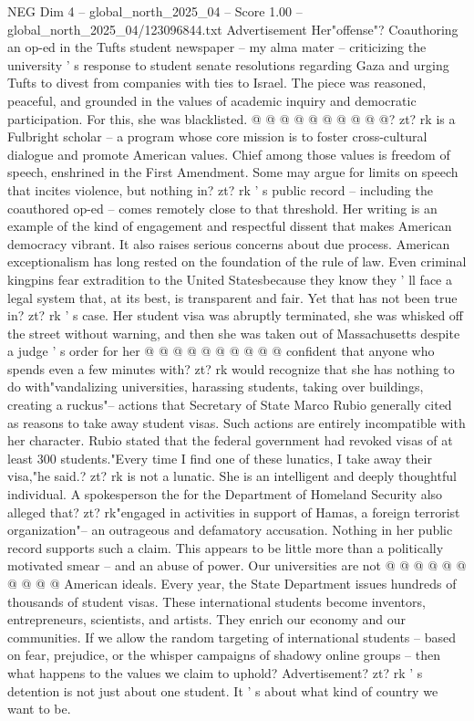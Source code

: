 \begin{textsample}{NEG Dim 4 – global\_north\_2025\_04 – Score 1.00 – global\_north\_2025\_04/123096844.txt}
Advertisement Her"offense"?
Coauthoring an op-ed in the Tufts student newspaper -- my alma mater -- criticizing the university ' s response to student senate resolutions regarding Gaza and urging Tufts to divest from companies with ties to Israel.
The piece was reasoned, peaceful, and grounded in the values of academic inquiry and democratic participation.
For this, she was blacklisted. @ @ @ @ @ @ @ @ @ @? zt? rk is a Fulbright scholar -- a program whose core mission is to foster cross-cultural dialogue and promote American values.
Chief among those values is freedom of speech, enshrined in the First Amendment.
Some may argue for limits on speech that incites violence, but nothing in? zt? rk ' s public record -- including the coauthored op-ed -- comes remotely close to that threshold.
Her writing is an example of the kind of engagement and respectful dissent that makes American democracy vibrant.
It also raises serious concerns about due process.
American exceptionalism has long rested on the foundation of the rule of law.
Even criminal kingpins fear extradition to the United Statesbecause they know they ' ll face a legal system that, at its best, is transparent and fair.
Yet that has not been true in? zt? rk ' s case.
Her student visa was abruptly terminated, she was whisked off the street without warning, and then she was taken out of Massachusetts despite a judge ' s order for her @ @ @ @ @ @ @ @ @ @ confident that anyone who spends even a few minutes with? zt? rk would recognize that she has nothing to do with"vandalizing universities, harassing students, taking over buildings, creating a ruckus"-- actions that Secretary of State Marco Rubio generally cited as reasons to take away student visas.
Such actions are entirely incompatible with her character.
Rubio stated that the federal government had revoked visas of at least 300 students."Every time I find one of these lunatics, I take away their visa,"he said.? zt? rk is not a lunatic.
She is an intelligent and deeply thoughtful individual.
A spokesperson the for the Department of Homeland Security also alleged that? zt? rk"engaged in activities in support of Hamas, a foreign terrorist organization"-- an outrageous and defamatory accusation.
Nothing in her public record supports such a claim.
This appears to be little more than a politically motivated smear -- and an abuse of power.
Our universities are not @ @ @ @ @ @ @ @ @ @ American ideals.
Every year, the State Department issues hundreds of thousands of student visas.
These international students become inventors, entrepreneurs, scientists, and artists.
They enrich our economy and our communities.
If we allow the random targeting of international students -- based on fear, prejudice, or the whisper campaigns of shadowy online groups -- then what happens to the values we claim to uphold?
Advertisement? zt? rk ' s detention is not just about one student.
It ' s about what kind of country we want to be.

\end{textsample}
